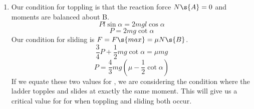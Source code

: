 \begin{problem}[A1987FMIIQ1l]
{\begin{enumerate}
\begin{enumerate}
		\item To start this question it is useful to define the length of the ladder as . We can find the reaction force  at A by taking moments about point B, as in Figure \ref{fig:Statics_ladder_slide_topple}.
\begin{equation*}	
Pl\sin{\alpha} + 4N\s{A}\sin{\alpha} = 2mgl\cos{\alpha}	
\end{equation*}
\begin{equation*}	
4N\s{A}\sin{\alpha} = 2mg\cos{\alpha} - P\sin{\alpha}	
\end{equation*}
\begin{equation*}	
N\s{A} = \frac{1}{2}mg\cot{\alpha} - \frac{1}{4}P 	
\end{equation*}
We can find the reaction force  at B by resolving vertically on the ladder.
\begin{equation*}	
N\s{B} = mg	
\end{equation*}
		\item Resolving horizontally on the ladder:
\begin{equation*}	
N\s{A} + P = F 	
\end{equation*}
\begin{equation*}	
F = \frac{1}{2}mg\cot{\alpha} - \frac{1}{4}P + P 	
\end{equation*}
\begin{equation*}	
F = \frac{3}{4}P + \frac{1}{2}mg\cot{\alpha} 	
\end{equation*}
	\end{enumerate}
	\item Our condition for toppling is that the reaction force $N\s{A} = 0$ and moments are balanced about B.
\begin{equation*}	
Pl\sin{\alpha} = 2mgl\cos{\alpha}	
\end{equation*}
\begin{equation*}	
P = 2mg\cot{\alpha}	
\end{equation*}
Our condition for sliding is $F = F\s{max} = \mu N\s{B}$.
\begin{equation*}
\frac{3}{4}P + \frac{1}{2}mg\cot{\alpha} = \mu mg	
\end{equation*}
\begin{equation*}
 P = \frac{4}{3}mg\left(\mu - \frac{1}{2}\cot{\alpha}\right)	
 \end{equation*}
 If we equate these two values for , we are considering the condition where the ladder topples and slides at exactly the same moment. This will give us a critical value for \vari{\mu} for when toppling and sliding both occur.

\end{enumerate}}
\end{problem}
